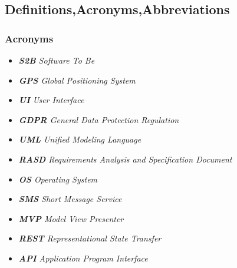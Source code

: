 \subsection{Definitions,Acronyms,Abbreviations}

\subsubsection{Acronyms}
\begin{itemize}
\item[] \emph{\textbf{S2B} Software To Be}
\item[] \emph{\textbf{GPS} Global Positioning System}
\item[] \emph{\textbf{UI} User Interface}
\item[] \emph{\textbf{GDPR} General Data Protection Regulation}
\item[] \emph{\textbf{UML} Unified Modeling Language}
\item[] \emph{\textbf{RASD} Requirements Analysis and Specification Document}
\item[] \emph{\textbf{OS} Operating System}
\item[] \emph{\textbf{SMS} Short Message Service}
\item[] \emph{\textbf{MVP} Model View Presenter}
\item[] \emph{\textbf{REST} Representational State Transfer}
\item[] \emph{\textbf{API} Application Program Interface}
\end{itemize}
